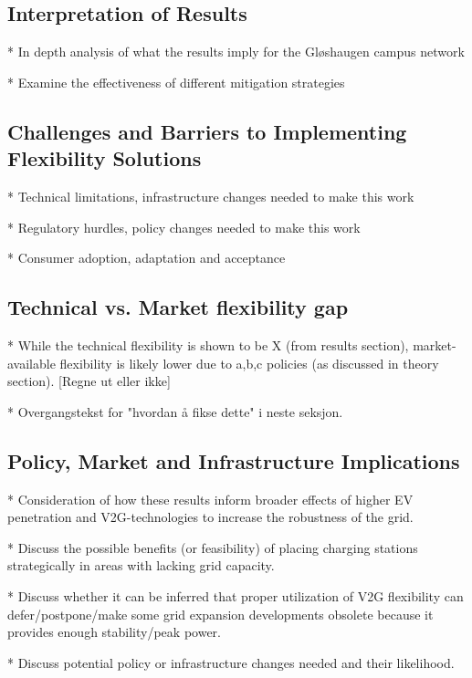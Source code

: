 \subsection{Interpretation of Results}

* In depth analysis of what the results imply for the Gløshaugen campus network

* Examine the effectiveness of different mitigation strategies



\subsection{Challenges and Barriers to Implementing Flexibility Solutions}

* Technical limitations, infrastructure changes needed to make this work

* Regulatory hurdles, policy changes needed to make this work

* Consumer adoption, adaptation and acceptance


\subsection{Technical vs. Market flexibility gap}

* While the technical flexibility is shown to be X (from results section), market-available flexibility is likely lower due to a,b,c policies (as discussed in theory section). [Regne ut eller ikke]

* Overgangstekst for "hvordan å fikse dette" i neste seksjon.


\subsection{Policy, Market and Infrastructure Implications}

* Consideration of how these results inform broader effects of higher EV penetration and V2G-technologies to increase the robustness of the grid.

* Discuss the possible benefits (or feasibility) of placing charging stations strategically in areas with lacking grid capacity.

* Discuss whether it can be inferred that proper utilization of V2G flexibility can defer/postpone/make some grid expansion developments obsolete because it provides enough stability/peak power.

* Discuss potential policy or infrastructure changes needed and their likelihood. 


